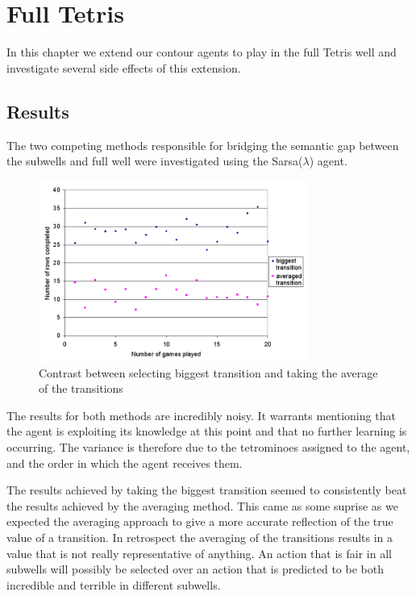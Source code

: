 \documentclass{rucsthesis}
\begin{document}
\chapter{Full Tetris}

In this chapter we extend our contour agents to play in the full Tetris well and investigate several side effects of this extension.

\section{Results}

The two competing methods responsible for bridging the semantic gap between the subwells and full well were investigated using the Sarsa($\lambda$) agent.

\begin{figure}[h]
\centering
\includegraphics[width=3.5in]{multisingle.png}
\caption{Contrast between selecting biggest transition and taking the average of the transitions}
\label{fig:multisingle}
\end{figure}

The results for both methods are incredibly noisy. It warrants mentioning that the agent is exploiting its knowledge at this point and that no further learning is occurring. The variance is therefore due to the tetrominoes assigned to the agent, and the order in which the agent receives them.

The results achieved by taking the biggest transition seemed to consistently beat the results achieved by the averaging method. This came as some suprise as we expected the averaging approach to give a more accurate reflection of the true value of a transition. In retrospect the averaging of the transitions results in a value that is not really representative of anything. An action that is fair in all subwells will possibly be selected over an action that is predicted to be both incredible and terrible in different subwells.
\end{document}
